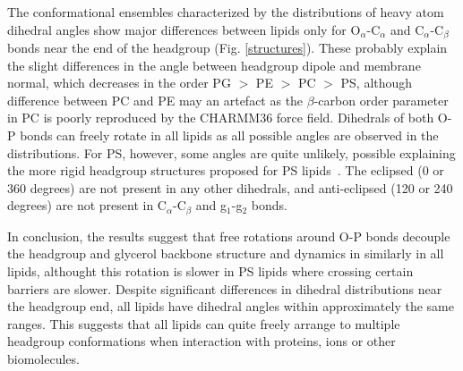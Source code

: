 \documentclass[aps,prl,superscriptaddress,twocolumn]{revtex4}
\begin{document}
The conformational ensembles characterized by the distributions of heavy atom dihedral angles
show major differences between lipids only for O$_\alpha$-C$_\alpha$ and  C$_\alpha$-C$_\beta$ bonds
near the end of the headgroup (Fig. \ref{structures}).
These probably explain the slight differences in the
angle between headgroup dipole and membrane normal, which decreases 
in the order PG $>$ PE  $>$ PC  $>$ PS, although difference between PC and PE may an artefact as
the $\beta$-carbon order parameter in PC is poorly reproduced by the CHARMM36 force field.
Dihedrals of both O-P bonds can freely rotate in all lipids as all possible angles
are observed in the distributions. For PS, however, some angles are quite unlikely,
possible explaining the more rigid headgroup structures proposed for PS lipids~\cite{browning80,buldt81}.
The eclipsed (0 or 360 degrees) are not present in any other dihedrals, and anti-eclipsed (120 or 240 degrees)
are not present in C$_\alpha$-C$_\beta$ and g$_1$-g$_2$ bonds.



In conclusion, the results suggest that free rotations around O-P bonds decouple the
headgroup and glycerol backbone structure and dynamics in similarly in all lipids,
althought this rotation is slower in PS lipids where crossing certain barriers are slower.
Despite significant differences in dihedral distributions near the headgroup end,
all lipids have dihedral angles within approximately the same ranges.
This suggests that all lipids can quite freely arrange to multiple headgroup conformations
when interaction with proteins, ions or other biomolecules.
\end{document}
